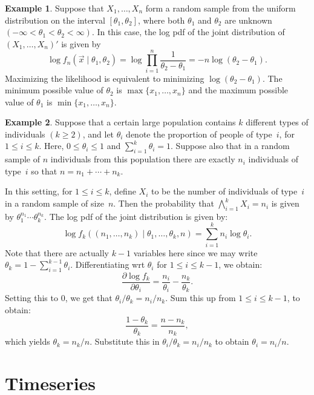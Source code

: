 \documentclass[11pt,a4]{article}
\theoremstyle{definition}
\newtheorem{example}{Example}
\begin{document}
\begin{example}
Suppose that $X_1, \ldots, X_n$ form a random sample from the uniform distribution
on the interval $[\theta_1, \theta_2]$, where both $\theta_1$ and $\theta_2$ 
are unknown $(-\infty < \theta_1 < \theta_2 < \infty)$. In this case, the 
log pdf of the joint distribution of $(X_1, \ldots, X_n)'$ is given by
\[
    \log f_n (\vec{x} \mid \theta_1, \theta_2) 
    = \log \prod_{i = 1}^n \frac{1}{\theta_2 - \theta_1}    
    = - n \log (\theta_2 - \theta_1).
\]
Maximizing the likelihood is equivalent to minimizing $\log (\theta_2 - \theta_1)$.
The minimum possible value of $\theta_2$ is $\max \{x_1, \ldots, x_n\}$
and the maximum possible value of $\theta_1$ is $\min \{x_1, \ldots, x_n\}$.
\end{example}

\begin{example}
Suppose that a certain large population contains $k$ different types of 
individuals $(k \geq 2)$, and let $\theta_i$ denote the proportion of people 
of type~$i$, for $1 \leq i \leq k$. Here, $0 \leq \theta_i \leq 1$ and 
$\sum_{i = 1}^k \theta_i = 1$. Suppose also that in a random sample of $n$ 
individuals from this population there are exactly $n_i$ individuals of type~$i$
so that $n = n_1 + \cdots + n_k$.

In this setting, for $1 \leq i \leq k$, define $X_i$ to be the number of 
individuals of type~$i$ in a random sample of size~$n$. Then the probability 
that $\bigwedge_{i = 1}^k X_i = n_i$ is given by $\theta_1^{n_1} \cdots \theta_k^{n_k}$.  
The log pdf of the joint distribution is given by:
\[
    \log f_k((n_1, \ldots, n_k) \mid \theta_1, \ldots, \theta_k, n) 
        = \sum_{i = 1}^k n_i \log \theta_i. 
\] 
Note that there are actually $k - 1$ variables here since we may write 
$\theta_k = 1 - \sum_{i = 1}^{k - 1} \theta_i$. Differentiating wrt $\theta_i$
for $1 \leq i \leq k - 1$, we obtain:
\[
    \frac{\partial \log f_k}{\partial \theta_i} 
        = \frac{n_i}{\theta_i} - \frac{n_k}{\theta_k}. 
\]
Setting this to $0$, we get that $\theta_i / \theta_k = n_i / n_k$. Sum this up
from $1 \leq i \leq k - 1$, to obtain:
\[
    \frac{1 - \theta_k}{\theta_k} = \frac{n - n_k}{n_k},
\] 
which yields $\theta_k = n_k / n$. Substitute this in $\theta_i / \theta_k = n_i / n_k$
to obtain $\theta_i = n_i / n$.
\end{example} 

\section{Timeseries}
\end{document}
